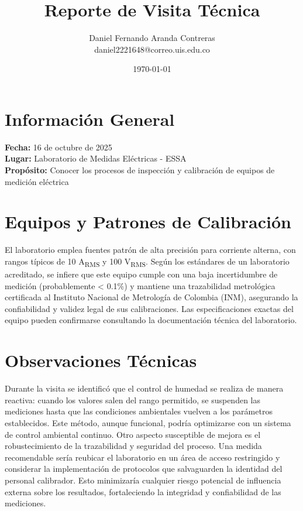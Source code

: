 \documentclass[11pt, a4paper, spanish]{article}
\title{\textbf{Reporte de Visita Técnica}}
\author{Daniel Fernando Aranda Contreras \\ daniel2221648@correo.uis.edu.co}
\date{\today}
\begin{document}
\maketitle

\section*{Información General}
\textbf{Fecha:} 16 de octubre de 2025 \\
\textbf{Lugar:} Laboratorio de Medidas Eléctricas - ESSA \\
\textbf{Propósito:} Conocer los procesos de inspección y calibración de equipos de medición eléctrica



\section*{Equipos y Patrones de Calibración}

El laboratorio emplea fuentes patrón de alta precisión para corriente alterna, con rangos típicos de 10 A\textsubscript{RMS} y 100 V\textsubscript{RMS}. Según los estándares de un laboratorio acreditado, se infiere que este equipo cumple con una baja incertidumbre de medición (probablemente < 0.1\%) y mantiene una trazabilidad metrológica certificada al Instituto Nacional de Metrología de Colombia (INM), asegurando la confiabilidad y validez legal de sus calibraciones. Las especificaciones exactas del equipo pueden confirmarse consultando la documentación técnica del laboratorio.\section*{Observaciones Técnicas}

Durante la visita se identificó que el control de humedad se realiza de manera reactiva: cuando los valores salen del rango permitido, se suspenden las mediciones hasta que las condiciones ambientales vuelven a los parámetros establecidos. Este método, aunque funcional, podría optimizarse con un sistema de control ambiental continuo. Otro aspecto susceptible de mejora es el robustecimiento de la trazabilidad y seguridad del proceso. Una medida recomendable sería reubicar el laboratorio en un área de acceso restringido y considerar la implementación de protocolos que salvaguarden la identidad del personal calibrador. Esto minimizaría cualquier riesgo potencial de influencia externa sobre los resultados, fortaleciendo la integridad y confiabilidad de las mediciones.
\end{document}

